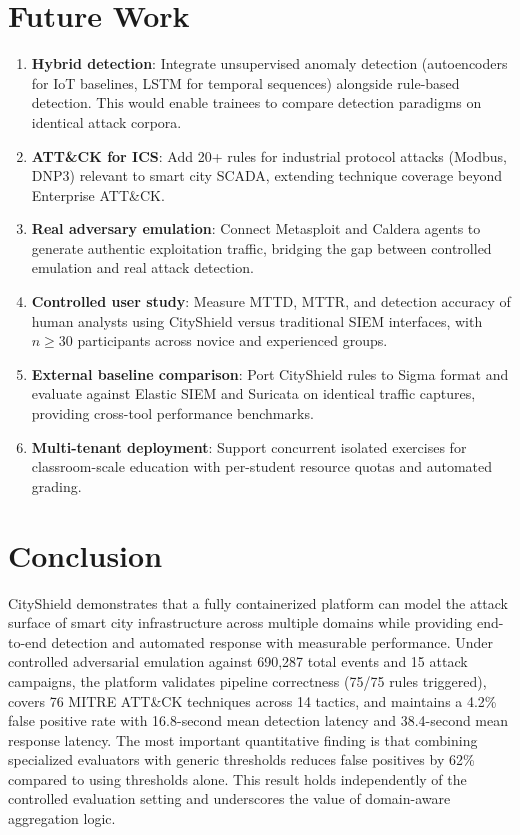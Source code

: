 \documentclass[conference,10pt]{IEEEtran}
\begin{document}
\section{Future Work}
\label{sec:future_work}

\begin{enumerate}[leftmargin=*]
    \item \textbf{Hybrid detection}: Integrate unsupervised anomaly detection (autoencoders for IoT baselines, LSTM for temporal sequences) alongside rule-based detection. This would enable trainees to compare detection paradigms on identical attack corpora.
    \item \textbf{ATT\&CK for ICS}: Add 20+ rules for industrial protocol attacks (Modbus, DNP3) relevant to smart city SCADA, extending technique coverage beyond Enterprise ATT\&CK.
    \item \textbf{Real adversary emulation}: Connect Metasploit and Caldera agents to generate authentic exploitation traffic, bridging the gap between controlled emulation and real attack detection.
    \item \textbf{Controlled user study}: Measure MTTD, MTTR, and detection accuracy of human analysts using CityShield versus traditional SIEM interfaces, with $n \geq 30$ participants across novice and experienced groups.
    \item \textbf{External baseline comparison}: Port CityShield rules to Sigma format and evaluate against Elastic SIEM and Suricata on identical traffic captures, providing cross-tool performance benchmarks.
    \item \textbf{Multi-tenant deployment}: Support concurrent isolated exercises for classroom-scale education with per-student resource quotas and automated grading.
\end{enumerate}

\section{Conclusion}
\label{sec:conclusion}

CityShield demonstrates that a fully containerized platform can model the attack surface of smart city infrastructure across multiple domains while providing end-to-end detection and automated response with measurable performance. Under controlled adversarial emulation against 690,287 total events and 15 attack campaigns, the platform validates pipeline correctness (75/75 rules triggered), covers 76 MITRE ATT\&CK techniques across 14 tactics, and maintains a 4.2\% false positive rate with 16.8-second mean detection latency and 38.4-second mean response latency. The most important quantitative finding is that combining specialized evaluators with generic thresholds reduces false positives by 62\% compared to using thresholds alone. This result holds independently of the controlled evaluation setting and underscores the value of domain-aware aggregation logic.
\end{document}

